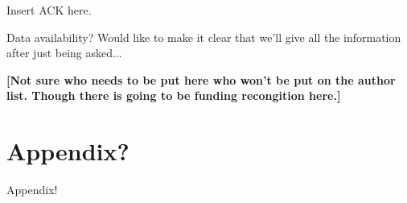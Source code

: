 \documentclass[twocolumn,linenumbers]{aastex631}
\begin{document}
\begin{acknowledgments}
Insert ACK here. 

\color{blue}Data availability? Would like to make it clear that we'll give all the information after just being asked...\color{black}

\textbf{\color{red}[Not sure who needs to be put here who won't be put on the author list. Though there is going to be funding recongition here.]\color{black}}
\end{acknowledgments}

\appendix

\section{Appendix?}

Appendix!

{}

\end{document}
